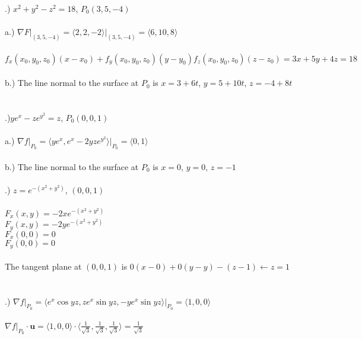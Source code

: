 \documentclass[12pt]{article}
\begin{document}
.) $x^{2} + y^{2} - z^{2} = 18$, \hspace{10pt} $P_{0}(3, 5, -4)$\\\\
\noindent a.) $\nabla F \Big|_{(3, 5, -4)}= \langle 2,2, -2\rangle \Big|_{(3, 5, -4)} = \langle 6, 10, 8\rangle$\\\\
\noindent $f_{x}(x_{0}, y_{0}, z_{0})(x-x_{0}) + f_{y}(x_{0}, y_{0}, z_{0})(y-y_{0}) f_{z}(x_{0}, y_{0}, z_{0})(z - z_{0})= 3x + 5y + 4z = 18$\\\\
\noindent b.) The line normal to the surface at $P_{0}$ is $x = 3 + 6t$, \hspace{10pt} $y = 5 + 10t$, \hspace{10pt} $z = -4 + 8t$\\\\\\
.)$ye^{x} -ze^{y^{2}} = z$, \hspace{10pt} $P_{0}(0, 0, 1)$\\\\
\noindent a.) $\nabla f \Big|_{P_{0}} = \langle ye^{x}, e^{x} - 2yze^{y^{2}} \rangle \Big|_{P_{0}} = \langle0, 1 \rangle$\\\\
\noindent b.) The line normal to the surface at $P_{0}$ is $x = 0$, \hspace{10pt} $y = 0$, \hspace{10pt} $z = -1$\\\\
.) $z = e^{-(x^{2} + y^{2})}$, \hspace{10pt} $(0, 0, 1)$\\\\
\noindent $F_{x} (x, y) = -2xe^{-(x^{2} + y^{2})}$\\
\noindent $F_{y} (x, y) = -2ye^{-(x^{2} + y^{2})}$\\
\noindent $F_{x}(0,0) = 0$\\
\noindent $F_{y}(0,0) = 0$\\\\
\noindent The tangent plane at $(0,0,1)$ is $0(x-0) + 0(y-y) - (z -1) \leftarrow z = 1$\\\\\\
.) $\nabla f \Big|_{P_{0}} = \langle e^{x}\cos{yz}, ze^{x}\sin{yz}, -ye^{x}\sin{yz} \rangle \Big|_{P_{0}} = \langle 1, 0, 0\rangle$\\\\
\noindent $\nabla f \Big|_{P_{0}} \cdot \mathbf{u} = \langle 1, 0, 0\rangle \cdot \langle \frac{1}{\sqrt{3}}, \frac{1}{\sqrt{3}}, \frac{1}{\sqrt{3}}\rangle  = \frac{1}{\sqrt{3}}$ \\\\
\end{document}
